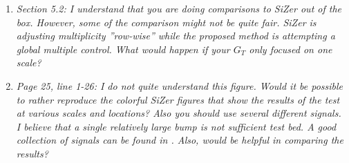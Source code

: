 \documentclass[a4paper,12pt]{article}
\begin{document}
\begin{enumerate}[label=(\arabic*),leftmargin=0.8cm]
\item \textit{Section 5.2: I understand that you are doing comparisons to SiZer out of the box. However, some of the comparison might not be quite fair. SiZer is adjusting multiplicity ”row-wise” while the proposed method is attempting a global multiple control. What would happen if your $G_T$ only focused on one scale?}



\item \textit{Page 25, line 1-26: I do not quite understand this figure. Would it be possible to rather reproduce the colorful SiZer figures that show the results of the test at various scales and locations? Also you should use several different signals. I believe that a single relatively large bump is not sufficient test bed. A good collection of signals can be found in \cite{DonohoJohnstone1995}. Also, would \cite{HannigLeePark2013} be helpful in comparing the results?}


\end{enumerate}
\end{document}
